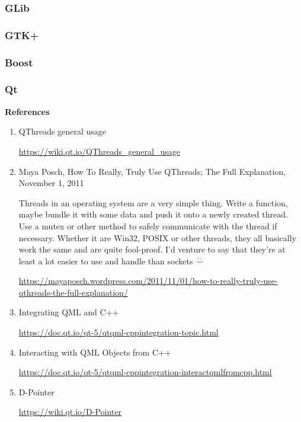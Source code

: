 \documentclass[12pt,a4paper]{article}
\begin{document}
\subsubsection{GLib}

\subsubsection{GTK+}

\subsubsection{Boost}

\subsubsection{Qt}

\textbf{References}

\begin{enumerate}
\item QThreads general usage

	\url{https://wiki.qt.io/QThreads_general_usage}

\item Maya Posch, How To Really, Truly Use QThreads; The Full
      Explanation, November 1, 2011

    Threads in an operating system are a very simple thing. Write a function, 
    maybe bundle it with some data and push it onto a newly created thread.  
    Use a mutex or other method to safely communicate with the thread if 
    necessary.  Whether it are Win32, POSIX or other threads, they all 
    basically work the same and are quite fool-proof. I’d venture to say that 
    they’re at least a lot easier to use and handle than sockets \Smiley 
    $\stackrel{..}{\smallsmile}$

	\small
    \url{https://mayaposch.wordpress.com/2011/11/01/how-to-really-truly-use-qthreads-the-full-explanation/}

\item Integrating QML and C++

	\url{https://doc.qt.io/qt-5/qtqml-cppintegration-topic.html}

\item Interacting with QML Objects from C++

	\url{https://doc.qt.io/qt-5/qtqml-cppintegration-interactqmlfromcpp.html}

\item D-Pointer

	\url{https://wiki.qt.io/D-Pointer}

\end{enumerate}
\end{document}
